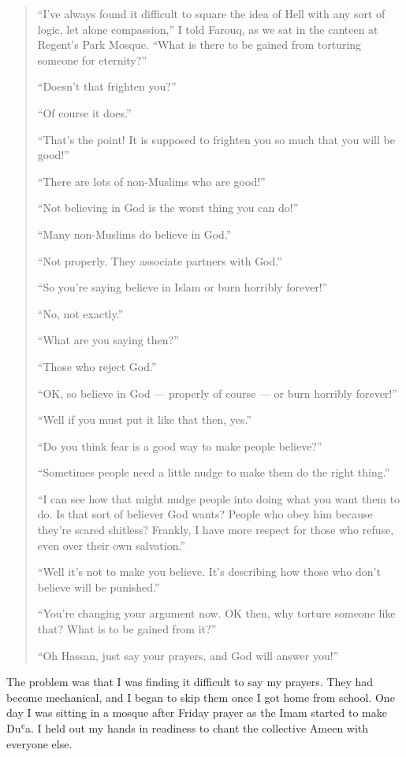 \documentclass[12pt]{memoir}
\def\`{ʿ} %
\begin{document}
\begin{quote}
“I’ve always found it difficult to square
the idea of Hell with any sort of logic, let alone compassion,”
I told Farouq, as we sat in the canteen at Regent’s Park Mosque.
“What is there to be gained from torturing someone for eternity?”

“Doesn’t that frighten you?”

“Of course it does.”

“That’s the point!
It is supposed to frighten you so much that you will be good!”

“There are lots of non-Muslims who are good!”

“Not believing in God is the worst thing you can do!”

“Many non-Muslims do believe in God.”

“Not properly.
They associate partners with God.”

“So you’re saying believe in Islam or burn horribly forever!”

“No, not exactly.”

“What are you saying then?”

“Those who reject God.”

“OK, so believe in God — properly of course — or burn horribly forever!”

“Well if you must put it like that then, yes.”

“Do you think fear is a good way to make people believe?”

“Sometimes people need a little nudge to make them do the right thing.”

“I can see how that might nudge people into doing what you want them to do.
Is that sort of believer God wants?
People who obey him because they’re scared shitless?
Frankly, I have more respect for those who refuse,
even over their own salvation.”

“Well it’s not to make you believe.
It’s describing how those who don’t believe will be punished.”

“You’re changing your argument now.
OK then, why torture someone like that? What is to be gained from it?”

“Oh Hassan, just say your prayers, and God will answer you!”
\end{quote}

The problem was that I was finding it difficult to say my prayers.
They had become mechanical,
and I began to skip them once I got home from school.
One day I was sitting in a mosque after Friday prayer
as the Imam started to make Du\`a.
I held out my hands in readiness
to chant the collective Ameen with everyone else.
\end{document}
